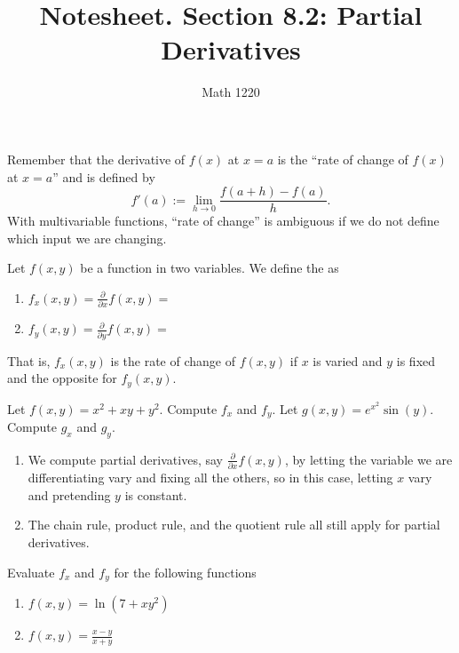 \documentclass[12pt, a4paper]{article}
\author{Math 1220}
\title{Notesheet. Section 8.2: Partial Derivatives}
\date{}
\begin{document}
\maketitle
\nameline
\vspace{-0.3in}
Remember that the derivative of \(f(x)\) at \(x=a\) is the ``rate of
change of \(f(x)\) at \(x=a\)'' and is defined by \[
  f'(a) := \lim_{h \to 0} \frac{f(a+h)-f(a)}{h}.
\]
With multivariable functions, ``rate
of change'' is ambiguous if we do not define which input we are
changing.
\begin{defi}
  Let \(f(x,y)\) be a function in two variables. We define the
   as
  \begin{enumerate}
  \item \(f_x(x,y) = \frac{\partial}{\partial x}f(x,y) = \)
  \item \(f_y(x,y) = \frac{\partial}{\partial y}f(x,y) = \)
  \end{enumerate}
  That is, \(f_x(x,y)\) is the rate of change of \(f(x,y)\) if \(x\)
  is varied and \(y\) is fixed and the opposite for \(f_y(x,y)\).
\end{defi}
\begin{ex}
  Let \(f(x,y) = x^2+xy+y^2\). Compute \(f_x\) and \(f_y\). Let
  \(g(x,y) = e^{x^2}\sin(y)\). Compute \(g_x\) and \(g_y\).
\end{ex}
\begin{rmk}
  \begin{enumerate}
  \item   We compute partial derivatives, say \(\frac{\partial}{\partial
    x}f(x,y)\), by letting the variable we are differentiating vary
  and fixing all the others, so in this case, letting \(x\) vary and
  pretending \(y\) is constant.
  \item The chain rule, product rule, and the quotient rule all still
    apply for partial derivatives.
  \end{enumerate}
\end{rmk}
\begin{ex}
  Evaluate \(f_x\) and \(f_y\) for the following functions
  \begin{enumerate}
  \item \(f(x,y) = \ln(7+xy^2)\)
    \vspace{1in}
  \item \(f(x,y) = \frac{x-y}{x+y}\)
  \end{enumerate}
\end{ex}
\vspace{-1in}
\end{document}
